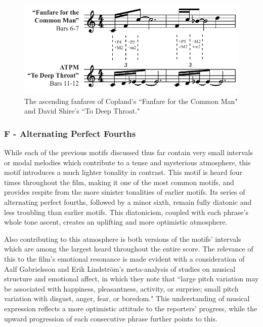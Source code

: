 \begin{figure}
    \centering
    \includegraphics[width=1\linewidth]{img/president-common.pdf}
    \caption{The ascending fanfares of Copland's ``Fanfare for the Common Man" and David Shire's ``To Deep Throat."}
    \label{fig:president-common}
\end{figure}


\subsubsection{F - Alternating Perfect Fourths
}
While each of the previous motifs discussed thus far contain very small intervals or modal melodies which contribute to a tense and mysterious atmosphere, this motif introduces a much lighter tonality in contrast.
This motif is heard four times throughout the film, making it one of the most common motifs, and provides respite from the more sinister tonalities of earlier motifs.
Its series of alternating perfect fourths, followed by a minor sixth, remain fully diatonic and less troubling than earlier motifs.
This diatonicism, coupled with each phrase's whole tone ascent, creates an uplifting and more optimistic atmosphere.

Also contributing to this atmosphere is both versions of the motifs' intervals which are among the largest heard throughout the entire score.
The relevance of this to the film's emotional resonance is made evident with a consideration of Aalf Gabrielsson and Erik Lindström's meta-analysis of studies on musical structure and emotional affect, in which they note that ``large pitch variation may be associated with happiness, pleasantness, activity, or surprise; small pitch variation with disgust, anger, fear, or boredom."\autocites[][389]{gabrielsson_role_2010}
This understanding of musical expression reflects a more optimistic attitude to the reporters' progress, while the upward progression of each consecutive phrase further points to this.

